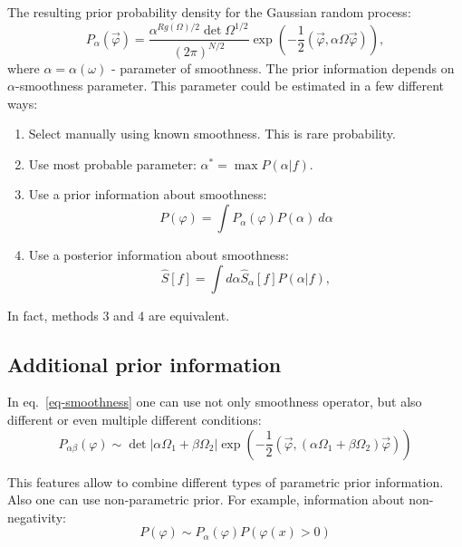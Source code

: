 \documentclass{webofc}
\begin{document}
The resulting prior probability density for the Gaussian random process:
\begin{equation}
	P_{\alpha}(\vec{\varphi})  = \frac{\alpha^{Rg(\Omega)/2}\det\Omega^{1/2}}{(2\pi)^{N/2}} 
    \exp\left(-\frac{1}{2}(\vec{\varphi},\alpha\Omega\vec{\varphi})\right),
\end{equation}
where  $\alpha = \alpha(\omega)$ - parameter of smoothness.
The prior information depends on $\alpha$-smoothness parameter. This parameter could be estimated in a few different ways:
\begin{enumerate}
\item Select manually using known smoothness. This is rare probability.
\item Use most probable parameter: $\alpha^* = \max P(\alpha|f).$
\item Use a prior information about smoothness: 
  \begin{equation}\label{eq:varAposteriorAlpha}
      P(\varphi)  = \int P_{\alpha}(\varphi) P(\alpha)~d\alpha
  \end{equation}
\item Use a posterior information about smoothness: 
  \begin{equation}\label{eq:solveAposteriorAlpha}
      \hat{S}[f] = \int d\alpha \hat{S}_{\alpha}[f] P(\alpha|f),
  \end{equation} 
\end{enumerate}

In fact, methods 3 and 4 are equivalent.

\subsection{Additional prior information}

In eq.~\ref{eq-smoothness} one can use not only smoothness operator, but also different or even multiple different conditions: 
\begin{equation*}
    P_{\alpha\beta}(\varphi) \sim  \det \left|\alpha\Omega_1 +\beta\Omega_2\right|\exp\left(-\frac{1}{2} (\vec{\varphi},(\alpha\Omega_1 + \beta\Omega_2)\vec{\varphi})\right)
\end{equation*}

This features allow to combine different types of parametric prior information. Also one can use non-parametric prior. For example, information about non-negativity:
\begin{equation*}
    P(\varphi) \sim P_{\alpha}(\varphi)P(\varphi(x) > 0)
\end{equation*}
\end{document}
